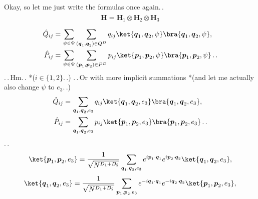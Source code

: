\documentclass{report}
\begin{document}
Okay, so let me just write the formulas once again.\,.
\begin{align}
\begin{aligned}
	\textbf{H} = \textbf{H}_{1} \otimes \textbf{H}_{2} \otimes \textbf{H}_3
\end{aligned}
\end{align} 
\begin{align}
\begin{aligned}
	\hat Q_{ij} =&\, \sum_{\psi \in \Psi} \sum_{(\boldsymbol{q}_1, \boldsymbol{q}_2) \in Q^{D}} 
		q_{ij} \ket{\boldsymbol{q}_1, \boldsymbol{q}_2, \psi} \bra{\boldsymbol{q}_1, \boldsymbol{q}_2, \psi}, \\
	\hat P_{ij} =&\, \sum_{\psi \in \Psi} \sum_{(\boldsymbol{p}_1, \boldsymbol{p}_2) \in P^{D}} 
		p_{ij} \ket{\boldsymbol{p}_1, \boldsymbol{p}_2, \psi} \bra{\boldsymbol{p}_1, \boldsymbol{p}_2, \psi}\,.\,.
\end{aligned}
\end{align} 
.\,.\,Hm.\,. *($i\in\{1,2\}$.\,.) 
.\,.\,Or with more implicit summations *(and let me actually also change $\psi$ to $e_3$.\,.)%
\begin{align}
\begin{aligned}
	\hat Q_{ij} =&\, \sum_{\boldsymbol{q}_1, \boldsymbol{q}_2, e_3} 
		q_{ij} 
		\ket{\boldsymbol{q}_1, \boldsymbol{q}_2, e_3} 
		\bra{\boldsymbol{q}_1, \boldsymbol{q}_2, e_3}, \\
	\hat P_{ij} =&\, \sum_{\boldsymbol{q}_1, \boldsymbol{q}_2, e_3} 
		p_{ij} 
		\ket{\boldsymbol{p}_1, \boldsymbol{p}_2, e_3} 
		\bra{\boldsymbol{p}_1, \boldsymbol{p}_2, e_3}\,.\,.
\end{aligned}
\end{align} 
.\,. 
\begin{align}
\begin{aligned}
	\ket{\boldsymbol{p}_1, \boldsymbol{p}_2, e_3} = \frac{1}{\sqrt{N^{D_1 + D_2}}} 
		\sum_{\boldsymbol{q}_1, \boldsymbol{q}_2, e_3}
		e^{i \boldsymbol{p}_1 \cdot \boldsymbol{q}_1} 
		e^{i \boldsymbol{p}_2 \cdot \boldsymbol{q}_2} 
		\ket{\boldsymbol{q}_1, \boldsymbol{q}_2, e_3} ,
\end{aligned}
\end{align} 
\begin{align}
\begin{aligned}
	\ket{\boldsymbol{q}_1, \boldsymbol{q}_2, e_3} = \frac{1}{\sqrt{N^{D_1 + D_2}}} 
		\sum_{\boldsymbol{p}_1, \boldsymbol{p}_2, e_3}
		e^{-i \boldsymbol{q}_1 \cdot \boldsymbol{q}_1} 
		e^{-i \boldsymbol{q}_2 \cdot \boldsymbol{q}_2} 
		\ket{\boldsymbol{p}_1, \boldsymbol{p}_2, e_3} ,
\end{aligned}
\end{align} 
\end{document}
